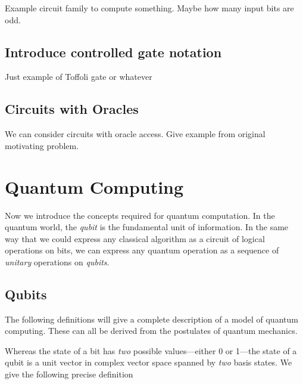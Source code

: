         \begin{example}
            Example circuit family to compute something. Maybe how many input bits are odd.  
            \begin{figure}[ht]
                \centering
                    \placeholderfig
                \caption{}
            \end{figure}
        \end{example}
        
        \subsection{Introduce controlled gate notation}
        
        Just example of Toffoli gate or whatever

        \subsection{Circuits with Oracles}

        We can consider circuits with oracle access.  Give example from original motivating problem.



\section{Quantum Computing}
        Now we introduce the concepts required for quantum computation. In the quantum world, the \emph{qubit} is 
        the fundamental unit of information. In the same way that we could express any classical algorithm as a 
        circuit of logical operations on bits, we can express any quantum operation as a sequence of \emph{unitary} 
        operations on \emph{qubits}.
       
   \subsection{Qubits}

        The following definitions will give a complete description of a model of quantum computing. These can all 
        be derived from the postulates of quantum mechanics.
        
        Whereas the state of a bit has \emph{two} possible values---either 0 or 1---the state of a qubit is a unit
        vector in complex vector space spanned by \emph{two} basis states. We give the following precise definition

